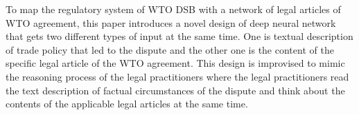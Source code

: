 To map the regulatory system of WTO DSB with a network of legal articles of WTO agreement,
this paper introduces a novel design of deep neural network \citep{DBLP:journals/corr/Schmidhuber14} that
gets two different types of input at the same time.
One is textual description of trade policy that led to the dispute and
the other one is the content of the specific legal article of the WTO agreement.
This design is improvised to mimic
the reasoning process of the legal practitioners
where the legal practitioners read
the text description of
factual circumstances of the dispute and think about the contents of
the applicable legal articles at the same time.
 
 
 
 
 
 


